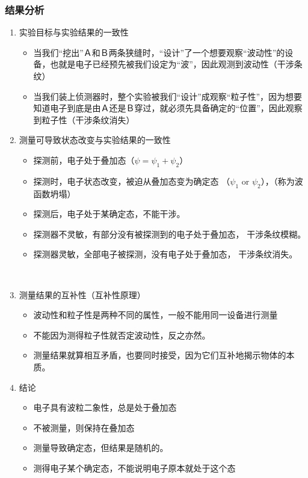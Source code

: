 \begin{frame} [allowframebreaks=]
    \frametitle{结果分析}
    \begin{enumerate}
        \item 实验目标与实验结果的一致性\\
        \begin{itemize}
            \item 当我们“挖出”Ａ和Ｂ两条狭缝时，“设计”了一个想要观察“波动性”的设备，也就是电子已经预先被我们设定为“波”，因此观测到波动性（干涉条纹）
            \item 当我们装上侦测器时，整个实验被我们“设计”成观察“粒子性”，因为想要知道电子到底是由Ａ还是Ｂ穿过，就必须先具备确定的“位置”，因此观察到粒子性（干涉条纹消失）
        \end{itemize}
        \item 测量可导致状态改变与实验结果的一致性 \\
        \begin{itemize}
            \item 探测前，电子处于叠加态（$ \psi =\psi_1+\psi_2$）
            \item 探测时，电子状态改变，被迫从叠加态变为确定态 （$\psi_1$ or $\psi_2$），（称为波函数坍塌）
            \item 探测后，电子处于某确定态，不能干涉。
            \item 探测器不灵敏，有部分没有被探测到的电子处于叠加态， 干涉条纹模糊。
            \item 探测器灵敏，全部电子被探测，没有电子处于叠加态， 干涉条纹消失。
        \end{itemize}
        ~~\\
        \item 测量结果的互补性（互补性原理）\\
        \begin{itemize}
            \item 波动性和粒子性是两种不同的属性，一般不能用同一设备进行测量
            \item 不能因为测得粒子性就否定波动性，反之亦然。
            \item 测量结果就算相互矛盾，也要同时接受，因为它们互补地揭示物体的本质。
        \end{itemize}
        \item 结论
        \begin{itemize}
            \item 电子具有波粒二象性，总是处于叠加态
            \item 不被测量，则保持在叠加态
            \item 测量导致确定态，但结果是随机的。
            \item 测得电子某个确定态，不能说明电子原本就处于这个态
        \end{itemize}
    \end{enumerate}
\end{frame}

